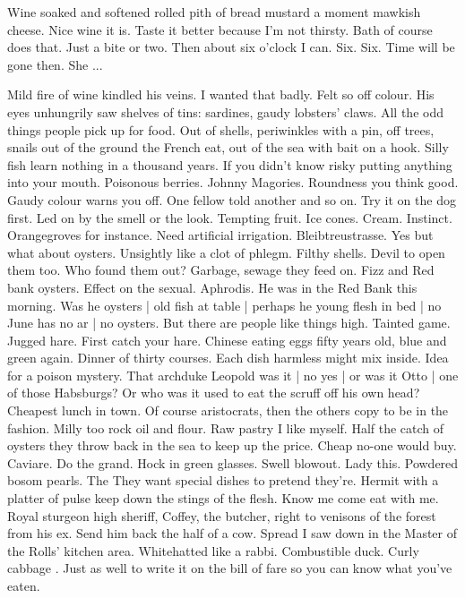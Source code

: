Wine soaked and softened rolled pith of bread
mustard a moment
mawkish cheese.
Nice wine it is.
Taste it better because I'm not thirsty.
Bath of course does that.
Just a bite or two.
Then about six o'clock I can.
Six.
Six.
Time will be gone then.
She ...

Mild fire of wine kindled his veins.
I wanted that badly.
Felt so off colour.
His eyes unhungrily saw shelves of tins:
sardines, gaudy lobsters' claws.
All the odd things people pick up for food.
Out of shells,
periwinkles with a pin,
off trees,
snails out of the ground the French eat,
out of the sea with bait on a hook.
Silly fish learn nothing in a thousand years.
If you didn't know risky putting anything into your mouth.
Poisonous berries.
Johnny Magories.
Roundness you think good.
Gaudy colour warns you off.
One fellow told another and so on.
Try it on the dog first.
Led on by the smell or the look.
Tempting fruit.
Ice cones.
Cream.
Instinct.
Orangegroves for instance.
Need artificial irrigation.
Bleibtreustrasse.
Yes but what about oysters.
Unsightly like a clot of phlegm.
Filthy shells.
Devil to open them too.
Who found them out?
Garbage, sewage they feed on.
Fizz and Red bank oysters.
Effect on the sexual.
Aphrodis.
He was in the Red Bank this morning.
Was he oysters |
old fish at table |
perhaps he young flesh in bed |
no June has no ar |
no oysters.
But there are people like things high.
Tainted game.
Jugged hare.
First catch your hare.
Chinese eating eggs fifty years old,
blue and green again.
Dinner of thirty courses.
Each dish harmless might mix inside.
Idea for a poison mystery.
That archduke Leopold was it |
no yes |
or was it Otto |
one of those Habsburgs?
Or who was it used to eat the scruff off his own head?
Cheapest lunch in town.
Of course aristocrats,
then the others copy to be in the fashion.
Milly too rock oil and flour.
Raw pastry I like myself.
Half the catch of oysters they throw back in the sea to keep up the price.
Cheap no-one would buy.
Caviare.
Do the grand.
Hock in green glasses.
Swell blowout.
Lady this.
Powdered bosom pearls.
The 
They want special dishes to pretend they're.
Hermit with a platter of pulse keep down the stings of the flesh.
Know me come eat with me.
Royal sturgeon high sheriff,
Coffey, the butcher,
right to venisons of the forest from his ex.
Send him back the half of a cow.
Spread I saw down in the Master of the Rolls' kitchen area.
Whitehatted  like a rabbi.
Combustible duck.
Curly cabbage .
Just as well to write it on the bill of fare so you can know what you've eaten.
